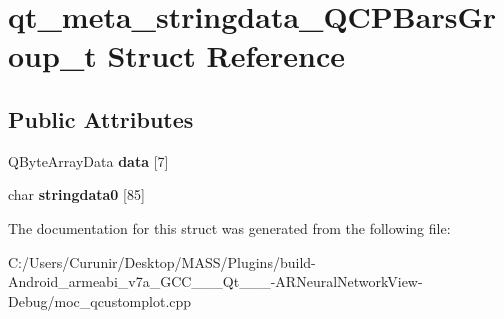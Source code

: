 \hypertarget{structqt__meta__stringdata___q_c_p_bars_group__t}{}\section{qt\+\_\+meta\+\_\+stringdata\+\_\+\+Q\+C\+P\+Bars\+Group\+\_\+t Struct Reference}
\label{structqt__meta__stringdata___q_c_p_bars_group__t}
\subsection*{Public Attributes}
\begin{DoxyCompactItemize}
\item 
\mbox{\label{structqt__meta__stringdata___q_c_p_bars_group__t_ab003d2ff2f1c04cef48c99ee19223130}} 
Q\+Byte\+Array\+Data {\bfseries data} \mbox{[}7\mbox{]}
\item 
\mbox{\label{structqt__meta__stringdata___q_c_p_bars_group__t_ad7a8409c72ad8912cd206d480cba383f}} 
char {\bfseries stringdata0} \mbox{[}85\mbox{]}
\end{DoxyCompactItemize}


The documentation for this struct was generated from the following file\+:\begin{DoxyCompactItemize}
\item 
C\+:/\+Users/\+Curunir/\+Desktop/\+M\+A\+S\+S/\+Plugins/build-\/\+Android\+\_\+armeabi\+\_\+v7a\+\_\+\+G\+C\+C\+\_\+\_\+\_\+\+Qt\+\_\+\_\+\_-\/\+A\+R\+Neural\+Network\+View-\/\+Debug/moc\+\_\+qcustomplot.\+cpp\end{DoxyCompactItemize}

